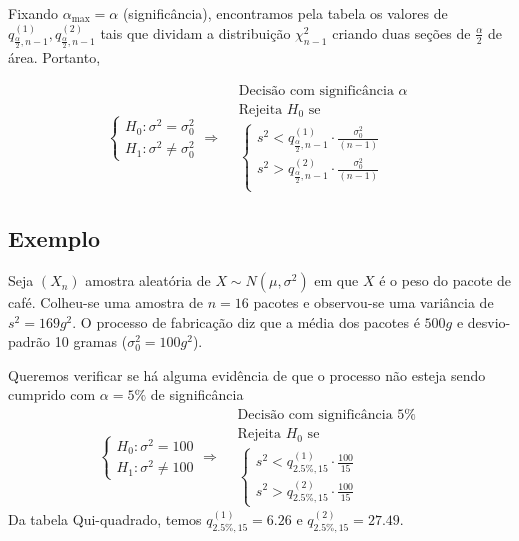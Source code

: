 \documentclass[
  letterpaper,
  DIV=11,
  numbers=noendperiod]{scrreprt}
\begin{document}
Fixando \(\alpha_{\max}=\alpha\) (significância), encontramos pela
tabela os valores de
\(q_{\frac{\alpha}{2},n-1}^{(1)}, q_{\frac{\alpha}{2},n-1}^{(2)}\) tais
que dividam a distribuição \(\chi^2_{n-1}\) criando duas seções de
\(\frac{\alpha}{2}\) de área. Portanto,

\[
\begin{cases}
H_{0} : \sigma^2 = \sigma^2_{0} \\
H_{1}: \sigma^2 \neq \sigma^2_{0}
\end{cases} \Rightarrow 
\begin{aligned}
& \text{Decisão com significância } \alpha \\
&\text{Rejeita $H_{0}$ se} \\
&\begin{cases}
s^2 < q_{\frac{\alpha}{2},n-1}^{(1)} \cdot \frac{\sigma^2_{0}}{(n-1)} \\
s^2 > q_{\frac{\alpha}{2},n-1}^{(2)} \cdot \frac{\sigma^2_{0}}{(n-1)}\\
\end{cases}
\end{aligned}
\]

\subsection{Exemplo}\label{exemplo-7}

Seja \((X_{n})\) amostra aleatória de \(X\sim N(\mu,\sigma^2)\) em que
\(X\) é o peso do pacote de café. Colheu-se uma amostra de \(n=16\)
pacotes e observou-se uma variância de \(s^2 =169g^2\). O processo de
fabricação diz que a média dos pacotes é \(500g\) e desvio-padrão 10
gramas (\(\sigma^2_{0}=100g^2\)).

Queremos verificar se há alguma evidência de que o processo não esteja
sendo cumprido com \(\alpha=5\%\) de significância \[
\begin{cases}
H_{0} : \sigma^2 = 100 \\
H_{1}: \sigma^2 \neq 100
\end{cases} \Rightarrow 
\begin{aligned}
& \text{Decisão com significância } 5\% \\
&\text{Rejeita $H_{0}$ se} \\
&\begin{cases}
s^2 < q_{2.5\%,15}^{(1)} \cdot \frac{100}{15} \\
s^2 > q_{2.5\%,15}^{(2)} \cdot \frac{100}{15}\
\end{cases}
\end{aligned}
\] Da tabela Qui-quadrado, temos \(q_{2.5\%,15}^{(1)} = 6.26\) e
\(q_{2.5\%,15}^{(2)} =27.49\).
\end{document}
